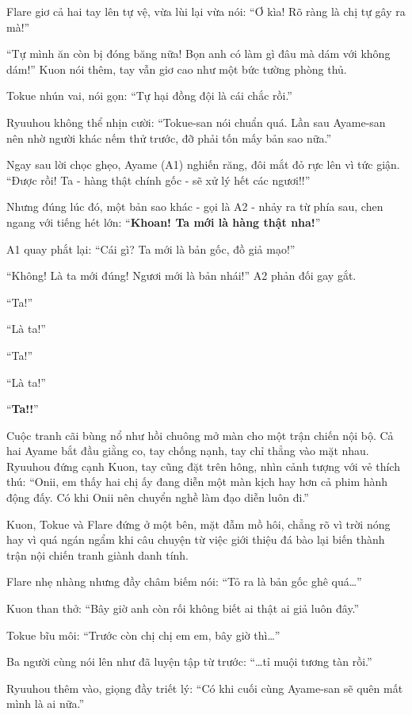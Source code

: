 \documentclass[../main.tex]{subfiles}
\begin{document}
Flare giơ cả hai tay lên tự vệ, vừa lùi lại vừa nói: ``Ơ kìa! Rõ ràng là chị tự gây ra mà!''

``Tự mình ăn còn bị đóng băng nữa! Bọn anh có làm gì đâu mà dám với không dám!'' Kuon nói thêm, tay vẫn giơ cao như một bức tường phòng thủ.

Tokue nhún vai, nói gọn: ``Tự hại đồng đội là cái chắc rồi.''

Ryuuhou không thể nhịn cười: ``Tokue-san nói chuẩn quá. Lần sau Ayame-san nên nhờ người khác nếm thử trước, đỡ phải tốn mấy bản sao nữa.''

Ngay sau lời chọc ghẹo, Ayame (A1) nghiến răng, đôi mắt đỏ rực lên vì tức giận. ``Được rồi! Ta - hàng thật chính gốc - sẽ xử lý hết các ngươi!!''

Nhưng đúng lúc đó, một bản sao khác - gọi là A2 - nhảy ra từ phía sau, chen ngang với tiếng hét lớn: ``\textbf{Khoan! Ta mới là hàng thật nha!}''

A1 quay phắt lại: ``Cái gì? Ta mới là bản gốc, đồ giả mạo!''

``Không! Là ta mới đúng! Ngươi mới là bản nhái!'' A2 phản đối gay gắt.

``Ta!''

``Là ta!''

``Ta!''

``Là ta!''

``\textbf{Ta!!}''


Cuộc tranh cãi bùng nổ như hồi chuông mở màn cho một trận chiến nội bộ. Cả hai Ayame bắt đầu giằng co, tay chống nạnh, tay chỉ thẳng vào mặt nhau. Ryuuhou đứng cạnh Kuon, tay cũng đặt trên hông, nhìn cảnh tượng với vẻ thích thú: ``Onii, em thấy hai chị ấy đang diễn một màn kịch hay hơn cả phim hành động đấy. Có khi Onii nên chuyển nghề làm đạo diễn luôn đi.''

Kuon, Tokue và Flare đứng ở một bên, mặt đẫm mồ hôi, chẳng rõ vì trời nóng hay vì quá ngán ngẩm khi câu chuyện từ việc giới thiệu đá bào lại biến thành trận nội chiến tranh giành danh tính.

Flare nhẹ nhàng nhưng đầy châm biếm nói: ``Tỏ ra là bản gốc ghê quá\dots''

Kuon than thở: ``Bây giờ anh còn rối không biết ai thật ai giả luôn đây.''

Tokue bĩu môi: ``Trước còn chị chị em em, bây giờ thì\dots''

Ba người cùng nói lên như đã luyện tập từ trước: ``\dots tỉ muội tương tàn rồi.''

Ryuuhou thêm vào, giọng đầy triết lý: ``Có khi cuối cùng Ayame-san sẽ quên mất mình là ai nữa.''
\end{document}
